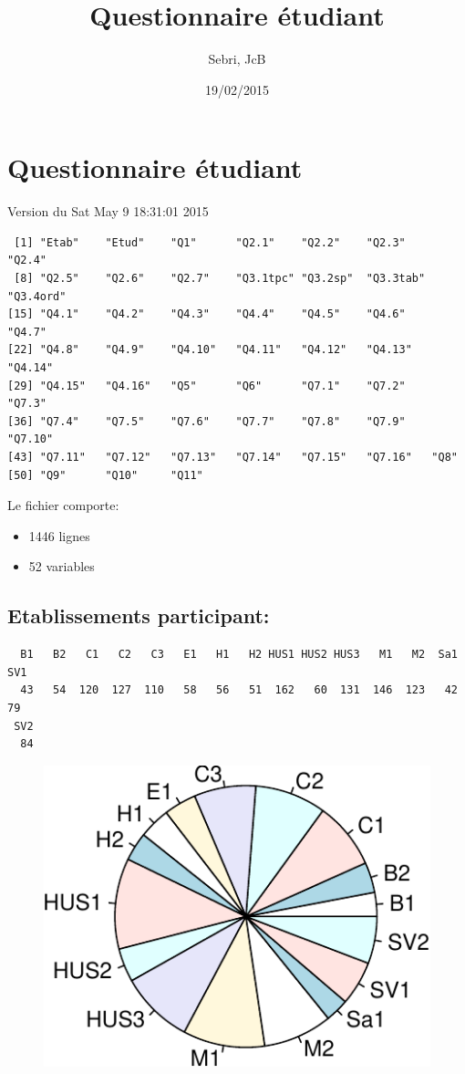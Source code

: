 \documentclass[]{article}
\title{Questionnaire étudiant}
\author{Sebri, JcB}
\date{19/02/2015}
\begin{document}
\maketitle


{
\hypersetup{linkcolor=black}
\setcounter{tocdepth}{2}
\tableofcontents
}
\section{Questionnaire étudiant}\label{questionnaire-etudiant}

Version du Sat May 9 18:31:01 2015

\begin{verbatim}
 [1] "Etab"    "Etud"    "Q1"      "Q2.1"    "Q2.2"    "Q2.3"    "Q2.4"   
 [8] "Q2.5"    "Q2.6"    "Q2.7"    "Q3.1tpc" "Q3.2sp"  "Q3.3tab" "Q3.4ord"
[15] "Q4.1"    "Q4.2"    "Q4.3"    "Q4.4"    "Q4.5"    "Q4.6"    "Q4.7"   
[22] "Q4.8"    "Q4.9"    "Q4.10"   "Q4.11"   "Q4.12"   "Q4.13"   "Q4.14"  
[29] "Q4.15"   "Q4.16"   "Q5"      "Q6"      "Q7.1"    "Q7.2"    "Q7.3"   
[36] "Q7.4"    "Q7.5"    "Q7.6"    "Q7.7"    "Q7.8"    "Q7.9"    "Q7.10"  
[43] "Q7.11"   "Q7.12"   "Q7.13"   "Q7.14"   "Q7.15"   "Q7.16"   "Q8"     
[50] "Q9"      "Q10"     "Q11"    
\end{verbatim}

Le fichier comporte:

\begin{itemize}
\itemsep1pt\parskip0pt
\item
  1446 lignes
\item
  52 variables
\end{itemize}

\subsection{Etablissements
participant:}\label{etablissements-participant}

\begin{verbatim}
  B1   B2   C1   C2   C3   E1   H1   H2 HUS1 HUS2 HUS3   M1   M2  Sa1  SV1 
  43   54  120  127  110   58   56   51  162   60  131  146  123   42   79 
 SV2 
  84 
\end{verbatim}

\begin{figure}[htbp]
\centering
\includegraphics{qs_etudiants_files/figure-latex/participants-1.pdf}
\end{figure}
\end{document}
